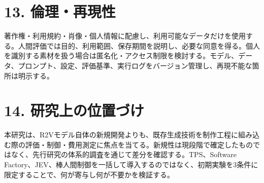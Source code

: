 \documentclass[11pt,a4paper]{article}
\begin{document}
\section*{13. 倫理・再現性}
著作権・利用規約・肖像・個人情報に配慮し、利用可能なデータだけを使用する。人間評価では目的、利用範囲、保存期間を説明し、必要な同意を得る。個人を識別する素材を扱う場合は匿名化・アクセス制限を検討する。モデル、データ、プロンプト、設定、評価基準、実行ログをバージョン管理し、再現不能な箇所は明示する。

\section*{14. 研究上の位置づけ}
本研究は、R2Vモデル自体の新規開発よりも、既存生成技術を制作工程に組み込む際の評価・制御・費用測定に焦点を当てる。新規性は現段階で確定したものではなく、先行研究の体系的調査を通じて差分を確認する。TPS、Software Factory、JEV、棒人間制御を一括して導入するのではなく、初期実験を3条件に限定することで、何が寄与し何が不要かを検証する。
\end{document}

